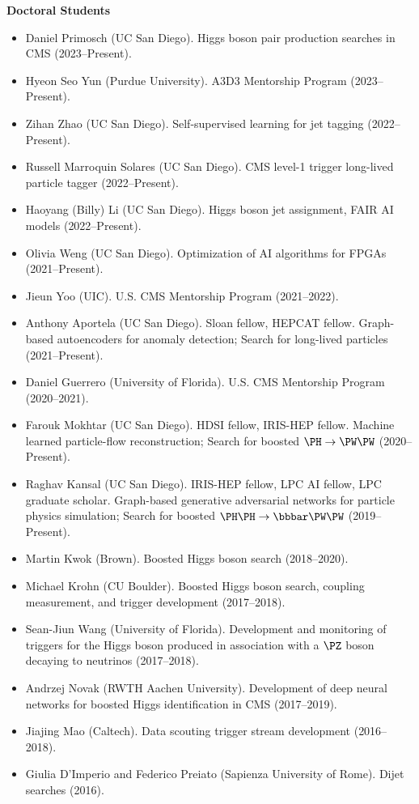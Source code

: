 \documentclass[11pt]{res}
\begin{document}
\begin{resume}
  \textbf{Doctoral Students}
  \begin{itemize}
    \itemsep-0.3em
    \item Daniel Primosch (UC San Diego). Higgs boson pair production searches in CMS (2023--Present).
    \item Hyeon Seo Yun (Purdue University). A3D3 Mentorship Program (2023--Present).
    \item Zihan Zhao (UC San Diego). Self-supervised learning for jet tagging ({2022--Present}).
    \item Russell Marroquin Solares (UC San Diego). CMS level-1 trigger long-lived particle tagger ({2022--Present}).
    \item Haoyang (Billy) Li (UC San Diego). Higgs boson jet assignment, FAIR AI models ({2022--Present}).
    \item Olivia Weng (UC San Diego). Optimization of AI algorithms for FPGAs ({2021--Present}).
    \item Jieun Yoo (UIC). U.S. CMS Mentorship Program ({2021--2022}).
    \item Anthony Aportela (UC San Diego). Sloan fellow, HEPCAT fellow. Graph-based autoencoders for anomaly detection; Search for long-lived particles ({2021--Present}).
    \item Daniel Guerrero (University of Florida). U.S. CMS Mentorship Program ({2020--2021}).
    \item Farouk Mokhtar (UC San Diego). HDSI fellow, IRIS-HEP fellow. Machine learned particle-flow reconstruction; Search for boosted $\PH\to\PW\PW$ ({2020--Present}).
    \item Raghav Kansal (UC San Diego). IRIS-HEP fellow, LPC AI fellow, LPC graduate scholar. Graph-based generative adversarial networks for particle physics simulation; Search for boosted $\PH\PH\to\bbbar\PW\PW$ ({2019--Present}).
    \item Martin Kwok (Brown). Boosted Higgs boson search ({2018--2020}).
    \item Michael Krohn (CU Boulder). Boosted Higgs boson search, coupling measurement, and trigger development ({2017--2018}).
    \item Sean-Jiun Wang (University of Florida). Development and monitoring of triggers for the Higgs boson produced in association with a $\PZ$ boson decaying to neutrinos ({2017--2018}).
    \item Andrzej Novak (RWTH Aachen University). Development of deep neural networks for boosted Higgs identification in CMS ({2017--2019}).
    \item Jiajing Mao (Caltech). Data scouting trigger stream development ({2016--2018}).
    \item Giulia D'Imperio and Federico Preiato (Sapienza University of Rome). Dijet searches ({2016}).
  \end{itemize}


\end{resume}
\end{document}
